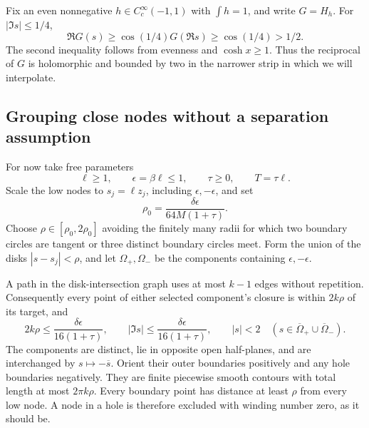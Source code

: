 Fix an even nonnegative \(h\in C_c^\infty(-1,1)\) with
\(\int h=1\), and write \(G=H_h\). For \(|\Im s|\le1/4\),
\begin{equation}\label{frontier:bump-reciprocal}
 \Re G(s)\ge\cos(1/4)G(\Re s)\ge\cos(1/4)>1/2.
\end{equation}
The second inequality follows from evenness and \(\cosh x\ge1\).
Thus the reciprocal of \(G\) is holomorphic and bounded by two
in the narrower strip in which we will interpolate.

\subsection{Grouping close nodes without a separation assumption}
For now take free parameters
\begin{equation}\label{frontier:free}
 \ell\ge1,\qquad \epsilon=\beta\ell\le1,\qquad
 \tau\ge0,\qquad T=\tau\ell.
\end{equation}
Scale the low nodes to \(s_j=\ell z_j\), including
\(\epsilon,-\epsilon\), and set
\[
 \rho_0=\frac{\delta\epsilon}{64M(1+\tau)}.
\]
Choose \(\rho\in[\rho_0,2\rho_0]\) avoiding the finitely many
radii for which two boundary circles are tangent or three distinct
boundary circles meet. Form the union of the disks
\(|s-s_j|<\rho\), and let \(\Omega_+,\Omega_-\) be the
components containing \(\epsilon,-\epsilon\).

A path in the disk-intersection graph uses at most \(k-1\) edges
without repetition. Consequently every point of either selected
component's closure is within \(2k\rho\) of its target, and
\begin{equation}\label{frontier:thin}
 2k\rho\le\frac{\delta\epsilon}{16(1+\tau)},\qquad
 |\Im s|\le\frac{\delta\epsilon}{16(1+\tau)},\qquad |s|<2
 \quad(s\in\overline\Omega_+\cup\overline\Omega_-).
\end{equation}
The components are distinct, lie in opposite open half-planes, and
are interchanged by \(s\mapsto-\overline s\). Orient their
outer boundaries positively and any hole boundaries negatively.
They are finite piecewise smooth contours with total length at most
\(2\pi k\rho\). Every boundary point has distance at least
\(\rho\) from every low node. A node in a hole is therefore
excluded with winding number zero, as it should be.

